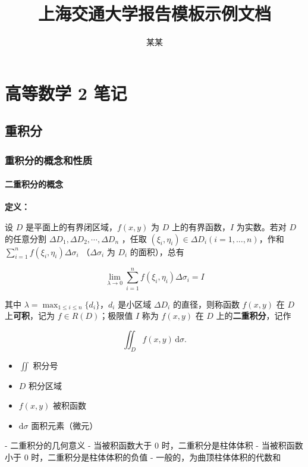 \documentclass[lang = zh , final , oneside , openany , titlepage , zihao = -4 , linespread = 1.3 , baselineskip = false , cjk-font = windows , text-font = newtx , math-font = newtx]{sjtureport}
\title{上海交通大学报告模板示例文档}
\author{某某}
\begin{document}
\maketitle

\setcounter{page}{1}  %
\pagestyle{plain}     %
\tableofcontents

\chapter{高等数学 2 笔记}

\section{重积分}

\subsection{重积分的概念和性质}

\subsubsection{二重积分的概念}

\textbf{定义：}

设 \(D\) 是平面上的有界闭区域，\(f(x,y)\) 为 \(D\) 上的有界函数，\(I\) 为实数。若对 \(D\) 的任意分割 \(\Delta D_1, \Delta D_2, \cdots, \Delta D_n\) ，任取 \((\xi_i, \eta_i)\in\Delta D_i(i = 1,\ldots,n)\)，作和 \(\sum_{i = 1}^n f(\xi_i,\eta_i)\Delta \sigma_i\) （\(\Delta \sigma_i\) 为 \(D_i\) 的面积），总有

\[
\lim_{\lambda\to 0}\sum_{i = 1}^n f(\xi_i,\eta_i)\Delta \sigma_i = I
\]

其中 \(\lambda = \max_{1\leq i\leq n} \{d_i\}\)，\(d_i\) 是小区域 \(\Delta D_i\) 的直径，则称函数 \(f(x,y)\) 在 \(D\) 上\textbf{可积}，记为 \(f\in R(D)\)；极限值 \(I\) 称为 \(f(x,y)\) 在 \(D\) 上的\textbf{二重积分}，记作

\[
\iint_D f(x,y)\,\mathrm{d}\sigma.
\]

\begin{itemize}
    \item \(\iint\) 积分号
    \item \(D\) 积分区域
    \item \(f(x,y)\) 被积函数
    \item \(\mathrm{d}\sigma\) 面积元素（微元）
\end{itemize}

- 二重积分的几何意义
  - 当被积函数大于 \(0\) 时，二重积分是柱体体积
  - 当被积函数小于 \(0\) 时，二重积分是柱体体积的负值
  - 一般的，为曲顶柱体体积的代数和
\end{document}
